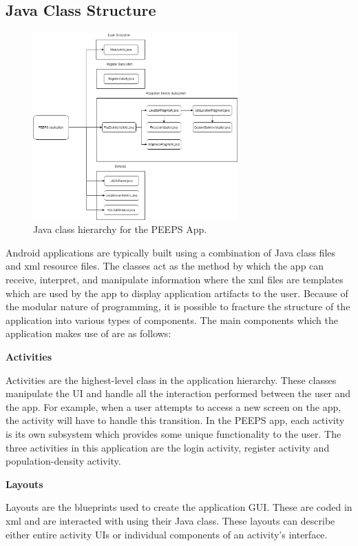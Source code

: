 \subsection{Java Class Structure}

\begin{figure}[ht]
    \centering
    \includegraphics[width=0.7\textwidth]{figures/ClassDiagram.png}
    \caption{Java class hierarchy for the PEEPS App.}
    \label{fig:class_diagram}
\end{figure}

Android applications are typically built using a combination of Java class files and xml resource files. The classes act as the method by which the app can receive, interpret, and manipulate information where the xml files are templates which are used by the app to display application artifacts to the user. Because of the modular nature of programming, it is possible to fracture the structure of the application into various types of components. The main components which the application makes use of are as follows:

\textbf{Activities}

Activities are the highest-level class in the application hierarchy. These classes manipulate the UI and handle all the interaction performed between the user and the app. For example, when a user attempts to access a new screen on the app, the activity will have to handle this transition. In the PEEPS app, each activity is its own subsystem which provides some unique functionality to the user. The three activities in this application are the login activity, register activity and population-density activity.

\textbf{Layouts}

Layouts are the blueprints used to create the application GUI. These are coded in xml and are interacted with using their Java class. These layouts can describe either entire activity UIs or individual components of an activity's interface.

